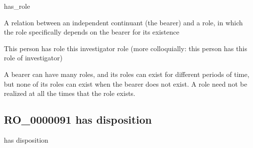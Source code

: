 \documentclass[letterpaper,10pt,english]{sphinxmanual}
\begin{document}
\begin{sphinxShadowBox}

\sphinxAtStartPar
has\_role
\end{sphinxShadowBox}

\begin{sphinxShadowBox}

\sphinxAtStartPar
{\hyperref[\detokenize{doc-RO_0000053::doc}]{}}
\end{sphinxShadowBox}

\begin{sphinxShadowBox}

\sphinxAtStartPar
A relation between an independent continuant (the bearer) and a role, in which the role specifically depends on the bearer for its existence
\end{sphinxShadowBox}

\begin{sphinxShadowBox}

\sphinxAtStartPar
This person has role this investigator role (more colloquially: this person has this role of investigator)
\end{sphinxShadowBox}

\begin{sphinxShadowBox}

\sphinxAtStartPar
A bearer can have many roles, and its roles can exist for different periods of time, but none of its roles can exist when the bearer does not exist. A role need not be realized at all the times that the role exists.
\end{sphinxShadowBox}

\begin{sphinxShadowBox}

\sphinxAtStartPar
{}
\end{sphinxShadowBox}
\begin{quote}

\ignorespaces \end{quote}


\subsection{RO\_0000091 \sphinxhyphen{} has disposition}
\label{\detokenize{doc-RO_0000091:ro-0000091-has-disposition}}\label{\detokenize{doc-RO_0000091:index-0}}\label{\detokenize{doc-RO_0000091::doc}}
\begin{sphinxShadowBox}

\sphinxAtStartPar
has disposition
\end{sphinxShadowBox}
\end{document}
